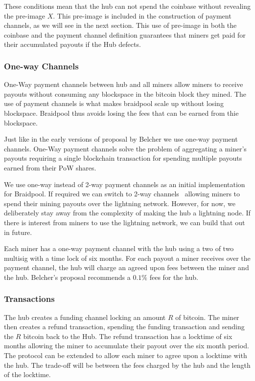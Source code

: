\documentclass{article}
\begin{document}
These conditions mean that the hub can not spend the coinbase without
revealing the pre-image $X$. This pre-image is included in the
construction of payment channels, as we will see in the next
section. This use of pre-image in both the coinbase and the payment
channel definition guarantees that miners get paid for their
accumulated payouts if the Hub defects.

\subsubsection{One-way Channels}

One-Way payment channels between hub and all miners allow miners to
receive payouts without consuming any blockspace in the bitcoin block
they mined. The use of payment channels is what makes braidpool scale
up without losing blockspace. Braidpool thus avoids losing the fees
that can be earned from thie blockspace.

Just like in the early versions of proposal by Belcher we use one-way
payment channels. One-Way payment channels solve the problem of
aggregating a miner's payouts requiring a single blockchain
transaction for spending multiple payouts earned from their PoW
shares.

We use one-way instead of 2-way payment channels as an initial
implementation for Braidpool. If required we can switch to 2-way
channels~\cite{poon2016bitcoin} allowing miners to spend their mining
payouts over the lightning network. However, for now, we deliberately
stay away from the complexity of making the hub a lightning node. If
there is interest from miners to use the lightning network, we can
build that out in future.

Each miner has a one-way payment channel with the hub using a two of
two multisig with a time lock of six months. For each payout a miner
receives over the payment channel, the hub will charge an agreed upon
fees between the miner and the hub. Belcher's proposal recommends a
$0.1\%$ fees for the hub.

\subsubsection{Transactions}

The hub creates a funding channel locking an amount $R$ of
bitcoin. The miner then creates a refund transaction, spending the
funding transaction and sending the $R$ bitcoin back to the Hub. The
refund transaction has a locktime of six months allowing the miner to
accumulate their payout over the six month period. The protocol can be
extended to allow each miner to agree upon a locktime with the
hub. The trade-off will be between the fees charged by the hub and the
length of the locktime.
\end{document}
